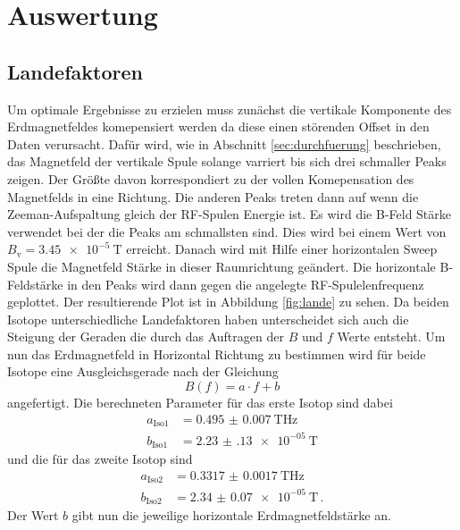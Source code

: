 \newpage
\section{Auswertung}
\label{sec:auswertung}
\subsection{Landefaktoren}
Um optimale Ergebnisse zu erzielen muss zunächst die vertikale Komponente des Erdmagnetfeldes komepensiert werden da diese einen störenden Offset in den Daten verursacht.
Dafür wird, wie in Abschnitt \ref{sec:durchfuerung} beschrieben, das Magnetfeld der vertikale Spule solange varriert bis sich drei schmaller Peaks zeigen.
Der Größte davon korrespondiert zu der vollen Komepensation des Magnetfelds in eine Richtung.
Die anderen Peaks treten dann auf wenn die Zeeman-Aufspaltung gleich der RF-Spulen Energie ist.
Es wird die B-Feld Stärke verwendet bei der die Peaks am schmallsten sind.
Dies wird bei einem Wert von $B_\text{v} = \SI{3.45e-5}{\tesla}$ erreicht.
Danach wird mit Hilfe einer horizontalen Sweep Spule die Magnetfeld Stärke in dieser Raumrichtung geändert.
Die horizontale B-Feldstärke in den Peaks wird dann gegen die angelegte RF-Spulelenfrequenz geplottet.
Der resultierende Plot ist in Abbildung \ref{fig:lande} zu sehen.
Da beiden Isotope unterschiedliche Landefaktoren haben unterscheidet sich auch die Steigung der Geraden die durch das Auftragen der $B$ und $f$ Werte entsteht.
Um nun das Erdmagnetfeld in Horizontal Richtung zu bestimmen wird für beide Isotope eine Ausgleichsgerade nach der Gleichung 
\begin{equation}
    B(f) = a\cdot f + b
\end{equation}
angefertigt.
Die berechneten Parameter für das erste Isotop sind dabei 
\begin{align*}
    a_\text{Iso1} & = \SI{0.495(7)}{\tesla\Hz} \\
    b_\text{Iso1} & = \SI{2.23(13)e-05}{\tesla}
\end{align*}
und die für das zweite Isotop sind
\begin{align*}
    a_\text{Iso2} &= \SI{0.3317(17)}{\tesla\Hz}\\ 
    b_\text{Iso2} &= \SI{2.34(7)e-05}{\tesla} \, .
\end{align*}
Der Wert $b$ gibt nun die jeweilige horizontale Erdmagnetfeldstärke an.
